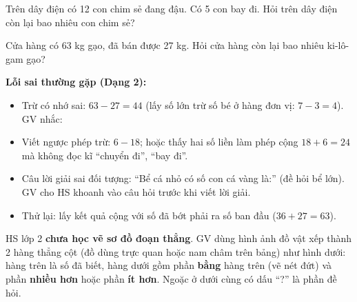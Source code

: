 \documentclass[../main.tex]{subfiles}
\begin{document}
\begin{bt}
Trên dây điện có 12 con chim sẻ đang đậu. Có 5 con bay đi. Hỏi trên dây điện còn lại bao nhiêu con chim sẻ?
\end{bt}
\begin{bt}
Cửa hàng có 63 kg gạo, đã bán được 27 kg. Hỏi cửa hàng còn lại bao nhiêu ki-lô-gam gạo?
\end{bt}
\begin{luuy}
    \textbf{Lỗi sai thường gặp (Dạng 2):}
    \begin{itemize}
        \item Trừ có nhớ sai: $63 - 27 = 44$ (lấy số lớn trừ số bé ở hàng đơn vị: $7 - 3 = 4$). GV nhắc: 
        \item Viết ngược phép trừ: $6 - 18$; hoặc thấy hai số liền làm phép cộng $18 + 6 = 24$ mà không đọc kĩ “chuyển đi”, “bay đi”.
        \item Câu lời giải sai đối tượng: “Bể cá nhỏ có số con cá vàng là:” (đề hỏi bể lớn). GV cho HS khoanh vào câu hỏi trước khi viết lời giải.
        \item Thử lại: lấy kết quả cộng với số đã bớt phải ra số ban đầu ($36 + 27 = 63$).
    \end{itemize}
\end{luuy}
\begin{luuy}
    HS lớp 2 \textbf{chưa học vẽ sơ đồ đoạn thẳng}. GV dùng hình ảnh đồ vật xếp thành 2 hàng thẳng cột (đồ dùng trực quan hoặc nam châm trên bảng) như hình dưới: hàng trên là số đã biết, hàng dưới gồm phần \textbf{bằng} hàng trên (vẽ nét đứt) và phần \textbf{nhiều hơn} hoặc phần \textbf{ít hơn}. Ngoặc ở dưới cùng có dấu “?” là phần đề hỏi.
\end{luuy}
\end{document}
